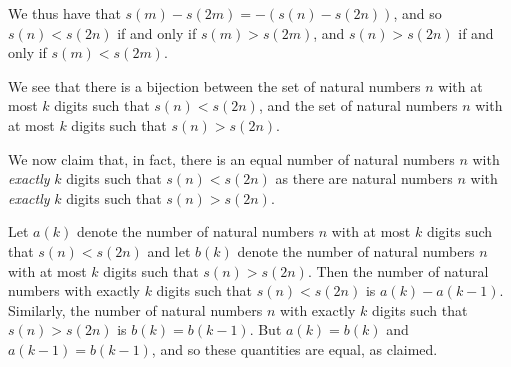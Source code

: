 \documentclass[12pt]{article}
\begin{document}
\begin{enumerate}
We thus have that $s(m) - s(2m) = -(s(n) - s(2n))$, and so $s(n) < s(2n)$ if and
only if $s(m) > s(2m)$, and $s(n) > s(2n)$ if and only if $s(m) < s(2m)$.

We see that there is a bijection between the set of natural numbers $n$ with at
most $k$ digits such that $s(n) < s(2n)$, and the set of natural numbers $n$
with at most $k$ digits such that $s(n) > s(2n)$.

We now claim that, in fact, there is an equal number of natural numbers $n$ with
\emph{exactly} $k$ digits such that $s(n) < s(2n)$ as there are natural numbers
$n$ with \emph{exactly} $k$ digits such that $s(n) > s(2n)$.

Let $a(k)$ denote the number of natural numbers $n$ with at most $k$ digits such
that $s(n) < s(2n)$ and let $b(k)$ denote the number of natural numbers $n$ with
at most $k$ digits such that $s(n) > s(2n)$. Then the number of natural numbers
with exactly $k$ digits such that $s(n) < s(2n)$ is $a(k) - a(k-1)$. Similarly,
the number of natural numbers $n$ with exactly $k$ digits such that $s(n) >
s(2n)$ is $b(k) = b(k - 1)$. But $a(k) = b(k)$ and $a(k - 1) = b(k - 1)$, and so
these quantities are equal, as claimed.

\end{enumerate}
\end{document}
